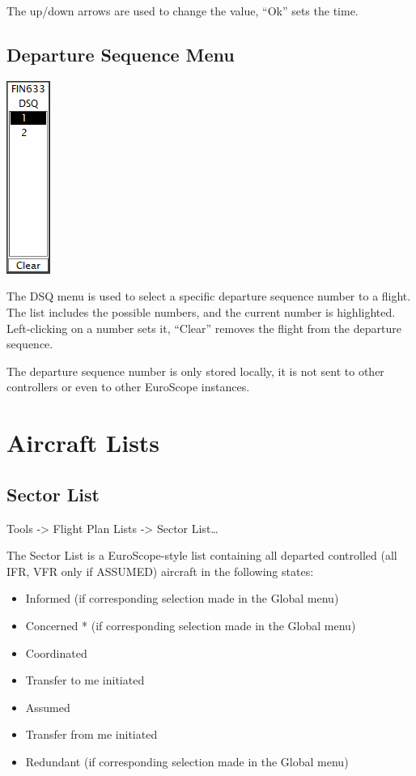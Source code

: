 \documentclass[11pt,a4paper]{memoir}
\newenvironment{Note}
  {\begin{shaded}\marginnote{\fbox{Note}}}
  {\end{shaded}}
\begin{document}
The up/down arrows are used to change the value, “Ok” sets the time.

\subsection{Departure Sequence Menu}
\label{dqm}
\includegraphics{img/dsq.png}

The DSQ menu is used to select a specific departure sequence number to a flight. The list includes the possible numbers, and the current number is highlighted. Left-clicking on a number sets it, “Clear” removes the flight from the departure sequence.

\begin{Note}
The departure sequence number is only stored locally, it is not sent to other controllers or even to other EuroScope instances.
\end{Note}

\section{Aircraft Lists}

\subsection{Sector List}
\label{list:sector}

\textit{} Tools -> Flight Plan Lists -> Sector List…

The Sector List is a EuroScope-style list containing all departed controlled (all IFR, VFR only if ASSUMED) aircraft in the following states:

\begin{itemize}
    \item Informed (if corresponding selection made in the Global menu)
    \item Concerned * (if corresponding selection made in the Global menu)
    \item Coordinated
    \item Transfer to me initiated
    \item Assumed
    \item Transfer from me initiated
    \item Redundant (if corresponding selection made in the Global menu)
\end{itemize}
\end{document}
